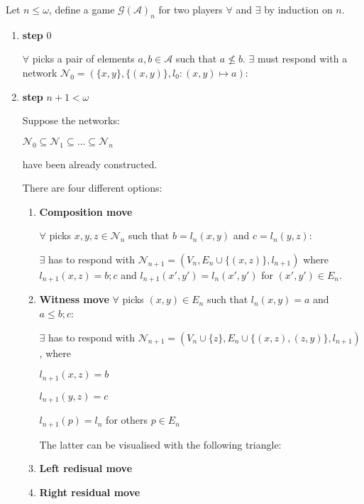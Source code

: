 \documentclass[a4paper]{article}
\theoremstyle{defin}
\theoremstyle{theorem}
\theoremstyle{claim}
\theoremstyle{prop}
\theoremstyle{lemma}
\theoremstyle{fact}
\theoremstyle{ex}
\theoremstyle{col}
\begin{document}
Let $n \leq \omega$, define a game $\mathcal{G}(\mathcal{A})_n$ for two players $\forall$ and $\exists$ by induction on $n$.
\begin{enumerate}
\item {\bf step} 0

$\forall$ picks a pair of elements $a, b \in \mathcal{A}$ such that $a \not\leq b$. $\exists$ must respond with a network $\mathcal{N}_0 = (\{ x, y\}, \{(x,y)\}, l_0 : (x,y) \mapsto a)$:


\item {\bf step} $n + 1 < \omega$

Suppose the networks:
\begin{center}
$\mathcal{N}_0 \subseteq \mathcal{N}_1 \subseteq \dots \subseteq \mathcal{N}_n$
\end{center}
have been already constructed.

There are four different options:
\begin{enumerate}
\item {\bf Composition move}

$\forall$ picks $x, y, z \in \mathcal{N}_n$ such that $b = l_n(x, y)$ and $c = l_n(y, z)$:


$\exists$ has to respond with $\mathcal{N}_{n + 1} = (V_n, E_n \cup \{ (x,z)\}, l_{n+1})$ where $l_{n+1}(x,z) = b ; c$ and $l_{n+1}(x',y') = l_n(x',y')$ for $(x', y') \in E_n$.


\item {\bf Witness move}
$\forall$ picks $(x,y) \in E_n$ such that $l_n(x,y) = a$ and $a \leq b ; c$:


$\exists$ has to respond with $\mathcal{N}_{n + 1} = (V_n \cup \{ z \}, E_n \cup \{ (x,z), (z, y) \}, l_{n + 1})$, where
\begin{center}
$l_{n + 1}(x, z) = b$

$l_{n + 1}(y, z) = c$

$l_{n + 1}(p) = l_n$ for others $p \in E_n$
\end{center}

The latter can be visualised with the following triangle:



\item {\bf Left redisual move}



\item {\bf Right residual move}



\end{enumerate}
\end{enumerate}
\end{document}
